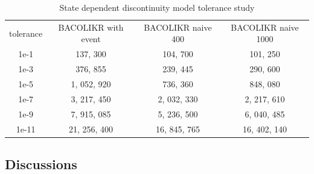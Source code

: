 \documentclass{article}
\begin{document}
\begin{table}[h]
\caption {State dependent discontinuity model tolerance study} 
\label{tab:pde_state_tol_study}
\begin{center}
\begin{tabular}{ c c c c } 
tolerance  & BACOLIKR  with event & BACOLIKR naive 400 & BACOLIKR naive 1000 \\ 
1e-1       & 137, 300             & 104, 700             & 101, 250  \\
1e-3       & 376, 855             & 239, 445             & 290, 600  \\
1e-5       & 1, 052, 920          & 736, 360             & 848, 080\\
1e-7       & 3, 217, 450          & 2, 032, 330            & 2, 217, 610 \\
1e-9       & 7, 915, 085          & 5, 236, 500            & 6, 040, 485\\
1e-11      & 21, 256, 400        & 16, 845, 765            & 16, 402, 140  \\
\end{tabular}
\end{center}
\end{table}

\subsection{Discussions}
\label{subsection:pde_discussions}
\end{document}
